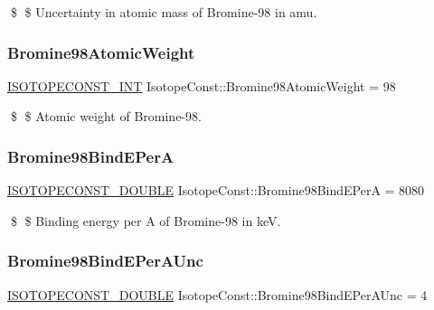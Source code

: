 \$ \$ Uncertainty in atomic mass of Bromine-\/98 in amu. \mbox{\label{group___isotope_const-_bromine-_br98_ga715faec93926eb627a36cedb1a89fbe8}} 
\subsubsection{\texorpdfstring{Bromine98\+Atomic\+Weight}{Bromine98AtomicWeight}}
{\footnotesize\ttfamily \mbox{\hyperlink{group___isotope_const-_macros_ga5f18360b3e99483a35c32d789e62621c}{I\+S\+O\+T\+O\+P\+E\+C\+O\+N\+S\+T\+\_\+\+I\+NT}} Isotope\+Const\+::\+Bromine98\+Atomic\+Weight = 98}

\$ \$ Atomic weight of Bromine-\/98. \mbox{\label{group___isotope_const-_bromine-_br98_ga67738674fe2349dc3b864a8f750b116d}} 
\subsubsection{\texorpdfstring{Bromine98\+Bind\+E\+PerA}{Bromine98BindEPerA}}
{\footnotesize\ttfamily \mbox{\hyperlink{group___isotope_const-_macros_ga8f45a7272ce02c0b4c65c44636ed719a}{I\+S\+O\+T\+O\+P\+E\+C\+O\+N\+S\+T\+\_\+\+D\+O\+U\+B\+LE}} Isotope\+Const\+::\+Bromine98\+Bind\+E\+PerA = 8080}

\$ \$ Binding energy per A of Bromine-\/98 in keV. \mbox{\label{group___isotope_const-_bromine-_br98_gae8cfd7c14cc054823897669173dca3d9}} 
\subsubsection{\texorpdfstring{Bromine98\+Bind\+E\+Per\+A\+Unc}{Bromine98BindEPerAUnc}}
{\footnotesize\ttfamily \mbox{\hyperlink{group___isotope_const-_macros_ga8f45a7272ce02c0b4c65c44636ed719a}{I\+S\+O\+T\+O\+P\+E\+C\+O\+N\+S\+T\+\_\+\+D\+O\+U\+B\+LE}} Isotope\+Const\+::\+Bromine98\+Bind\+E\+Per\+A\+Unc = 4}

